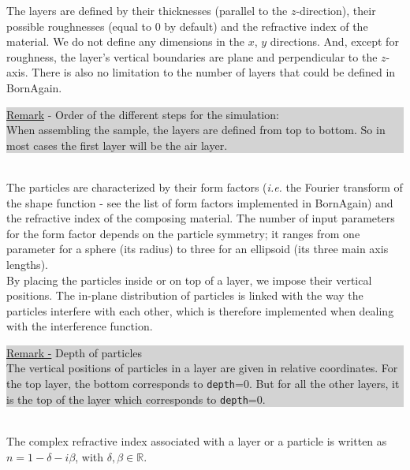 \noindent The layers are defined by their thicknesses (parallel to the
$z$-direction), their possible
roughnesses (equal to 0 by default) and the refractive index of the
material. We do not define any dimensions in the $x$, $y$
directions. And, except for roughness, the layer's vertical boundaries are plane and
perpendicular to the $z$-axis. There is also no limitation to the
number of layers that could be defined in BornAgain.\\

\noindent {\huge\danger} 
\colorbox{Lightgray}{\parbox{\dimexpr\linewidth-8\fboxsep}
{\underline{Remark} - Order of the different steps for the simulation: \\
When assembling the sample, the layers are defined from top to
bottom. So in most cases the first layer will be the air layer.}}\\

\noindent The particles are characterized by their form factors (\textit{i.e.} the Fourier transform of the shape function - see the list of form factors implemented
  in BornAgain) and
the refractive index of the composing material. The number of input parameters for the form
  factor depends on the
  particle symmetry; it ranges from one parameter for a sphere (its
  radius) to three for an ellipsoid (its three main axis lengths).\\ By
  placing the particles
inside or on top of a layer, we impose their vertical positions. The in-plane distribution of particles is linked with the way the
particles interfere with each other, which is therefore implemented
when dealing with the interference function. \\

\noindent {\huge\danger} 
\colorbox{Lightgray}{\parbox{\dimexpr\linewidth-8\fboxsep}
{\underline{Remark -} Depth of particles\\
The vertical positions of particles in a layer are given in relative
coordinates. For the top layer, the bottom corresponds to
\texttt{depth}=0. But for all the other layers, it is the top of the
layer which corresponds to \texttt{depth}=0.}}\\


\noindent The complex refractive index associated with a layer or a particle is written as $n=1-\delta -i\beta$, with
$\delta, \beta \in \mathbb{R}$. \\


